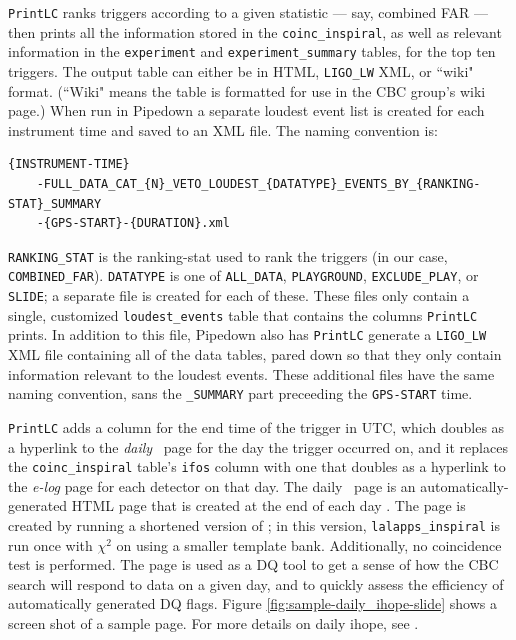\texttt{PrintLC} ranks triggers according to a given statistic --- say, combined
\ac{FAR} --- then prints all the information stored in the
\verb|coinc_inspiral|, as well as relevant information in the \verb|experiment|
and \verb|experiment_summary| tables, for the top ten triggers. The output
table can either be in HTML, \verb|LIGO_LW| XML, or ``wiki" format. (``Wiki"
means the table is formatted for use in the \ac{CBC} group's wiki page.) When
run in Pipedown a separate loudest event list is created for each instrument
time and saved to an XML file. The naming convention is:
\begin{footnotesize}
\begin{verbatim}
{INSTRUMENT-TIME}
    -FULL_DATA_CAT_{N}_VETO_LOUDEST_{DATATYPE}_EVENTS_BY_{RANKING-STAT}_SUMMARY
    -{GPS-START}-{DURATION}.xml
\end{verbatim}
\end{footnotesize}

\verb|RANKING_STAT| is the ranking-stat used to rank the triggers (in our case,
\verb|COMBINED_FAR|). \verb|DATATYPE| is one of \verb|ALL_DATA|,
\verb|PLAYGROUND|, \verb|EXCLUDE_PLAY|, or \verb|SLIDE|; a separate file is
created for each of these. These files only contain a single, customized
\verb|loudest_events| table that contains the columns \texttt{PrintLC} prints. In
addition to this file, Pipedown also has \texttt{PrintLC} generate a \verb|LIGO_LW| XML
file containing all of the data tables, pared down so that they only contain
information relevant to the loudest events. These additional files have the
same naming convention, sans the \verb|_SUMMARY| part preceeding the
\verb|GPS-START| time.

\texttt{PrintLC} adds a column for the end time of the trigger in UTC, which doubles as
a hyperlink to the \emph{daily} \ihope~page for the day the trigger occurred
on, and it replaces the \verb|coinc_inspiral| table's \verb|ifos| column with
one that doubles as a hyperlink to the \emph{e-log} page for each detector on
that day. The daily \ihope~page is an automatically-generated HTML page that is
created at the end of each day \cite{Pekowsky:thesis}. The page is created by
running a shortened version of \ihope; in this version, \verb|lalapps_inspiral|
is run once with $\chi^2$ on using a smaller template bank. Additionally, no
coincidence test is performed. The page is used as a \ac{DQ} tool to get a
sense of how the \ac{CBC} search will respond to data on a given day, and to
quickly assess the efficiency of automatically generated \ac{DQ} flags. Figure
\ref{fig:sample-daily_ihope-slide} shows a screen shot of a sample page. For
more details on daily ihope, see \cite{Pekowsky:thesis}.

